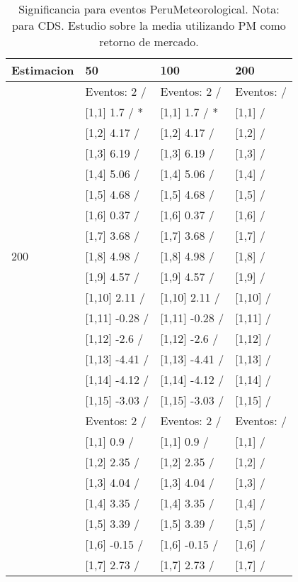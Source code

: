 \begin{table}

\caption{Significancia para eventos PeruMeteorological. Nota: para CDS. Estudio sobre la media utilizando PM como retorno de mercado.}
\centering
\begin{tabular}[t]{llll}
\toprule
Estimacion & 50 & 100 & 200\\
\midrule
 & Eventos:  2 / & Eventos:  2 / & Eventos:   /\\
 & {}[1,1] 1.7  / * & {}[1,1] 1.7  / * & {}[1,1]  /\\
 & {}[1,2] 4.17  / & {}[1,2] 4.17  / & {}[1,2]  /\\
 & {}[1,3] 6.19  / & {}[1,3] 6.19  / & {}[1,3]  /\\
 & {}[1,4] 5.06  / & {}[1,4] 5.06  / & {}[1,4]  /\\
\addlinespace
 & {}[1,5] 4.68  / & {}[1,5] 4.68  / & {}[1,5]  /\\
 & {}[1,6] 0.37  / & {}[1,6] 0.37  / & {}[1,6]  /\\
 & {}[1,7] 3.68  / & {}[1,7] 3.68  / & {}[1,7]  /\\
200 & {}[1,8] 4.98  / & {}[1,8] 4.98  / & {}[1,8]  /\\
 & {}[1,9] 4.57  / & {}[1,9] 4.57  / & {}[1,9]  /\\
\addlinespace
 & {}[1,10] 2.11  / & {}[1,10] 2.11  / & {}[1,10]  /\\
 & {}[1,11] -0.28  / & {}[1,11] -0.28  / & {}[1,11]  /\\
 & {}[1,12] -2.6  / & {}[1,12] -2.6  / & {}[1,12]  /\\
 & {}[1,13] -4.41  / & {}[1,13] -4.41  / & {}[1,13]  /\\
 & {}[1,14] -4.12  / & {}[1,14] -4.12  / & {}[1,14]  /\\
\addlinespace
 & {}[1,15] -3.03  / & {}[1,15] -3.03  / & {}[1,15]  /\\
 & Eventos:  2 / & Eventos:  2 / & Eventos:   /\\
 & {}[1,1] 0.9  / & {}[1,1] 0.9  / & {}[1,1]  /\\
 & {}[1,2] 2.35  / & {}[1,2] 2.35  / & {}[1,2]  /\\
 & {}[1,3] 4.04  / & {}[1,3] 4.04  / & {}[1,3]  /\\
\addlinespace
 & {}[1,4] 3.35  / & {}[1,4] 3.35  / & {}[1,4]  /\\
 & {}[1,5] 3.39  / & {}[1,5] 3.39  / & {}[1,5]  /\\
 & {}[1,6] -0.15  / & {}[1,6] -0.15  / & {}[1,6]  /\\
 & {}[1,7] 2.73  / & {}[1,7] 2.73  / & {}[1,7]  /\\

\end{tabular}
\end{table}
